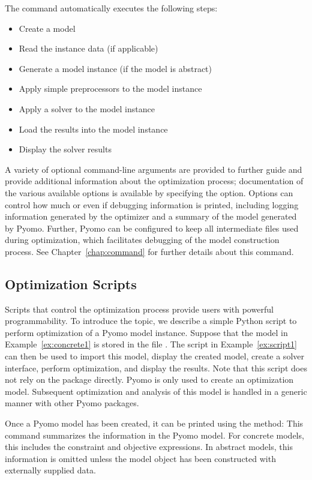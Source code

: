 The  command automatically executes the following steps:
\begin{itemize}
\item Create a model
\item Read the instance data (if applicable)
\item Generate a model instance (if the model is abstract)
\item Apply simple preprocessors to the model instance
\item Apply a solver to the model instance
\item Load the results into the model instance
\item Display the solver results
\end{itemize}
A variety of optional command-line arguments are provided to further guide and 
provide additional information about the optimization process; documentation of
the various available options is available by specifying the  option.
Options can control how much or even if debugging information is printed, including 
logging information generated by the optimizer and a summary of the model generated 
by Pyomo. Further, Pyomo can be configured to keep all intermediate files used
during optimization, which facilitates debugging of the model construction process. 
See Chapter~\ref{chap:command} for further details about this command.


\subsection{Optimization Scripts \label{sec:optscripts}}

Scripts that control the optimization process provide users with powerful
programmability.  To introduce the topic, we describe a simple Python
script to perform optimization of a Pyomo model instance. Suppose
that the model in Example~\ref{ex:concrete1} is stored in the file
. The script in Example~\ref{ex:script1} can then be
used to import this model, display the created model, create a solver
interface, perform optimization, and display the results. Note that this
script does not rely on the  package directly. Pyomo
is only used to create an optimization model.  Subsequent optimization
and analysis of this model is handled in a generic manner with other
Pyomo packages.

Once a Pyomo model has been created, it can be printed using the  method:
This command summarizes the information in the Pyomo model.  For concrete models, this 
includes the constraint and objective expressions. In abstract models, this information
is omitted unless the model object has been constructed with externally supplied data.


